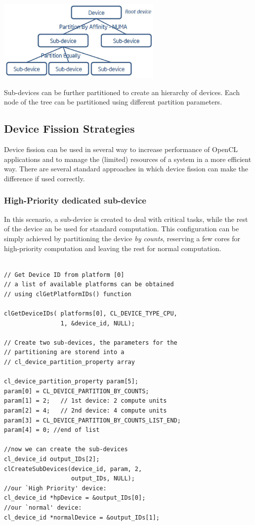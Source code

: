 \begin{figurehere}
 \centering
 \includegraphics[width=8cm, height=4cm]{./eps/partitionTree.eps}
 \caption{Sub-devices can be further partitioned to create an hierarchy of devices. Each node of the tree can be partitioned using different partition parameters.}
 \label{fig:subdevicestree}
\end{figurehere}

\subsection{Device Fission Strategies}
Device fission can be used in several way to increase performance of OpenCL applications and to manage the (limited) resources of a system in a more efficient way. There are several standard approaches in which device fission can make the difference if used correctly.

\subsubsection{High-Priority dedicated sub-device}
In this scenario, a sub-device is created to deal with critical tasks, while the rest of the device an be used for standard computation.
This configuration can be simply achieved by partitioning the device \textit{by counts}, reserving a few cores for high-priority computation and leaving the rest for normal computation.

{\footnotesize\begin{verbatim}

// Get Device ID from platform [0]
// a list of available platforms can be obtained
// using clGetPlatformIDs() function

clGetDeviceIDs( platforms[0], CL_DEVICE_TYPE_CPU,
                1, &device_id, NULL);
								
// Create two sub-devices, the parameters for the
// partitioning are storend into a 
// cl_device_partition_property array

cl_device_partition_property param[5];
param[0] = CL_DEVICE_PARTITION_BY_COUNTS;
param[1] = 2;   // 1st device: 2 compute units
param[2] = 4; 	// 2nd device: 4 compute units
param[3] = CL_DEVICE_PARTITION_BY_COUNTS_LIST_END;
param[4] = 0; //end of list

//now we can create the sub-devices
cl_device_id output_IDs[2]; 
clCreateSubDevices(device_id, param, 2,
                   output_IDs, NULL);
//our `High Priority' device:
cl_device_id *hpDevice = &output_IDs[0];  
//our `normal' device:    
cl_device_id *normalDevice = &output_IDs[1]; 

\end{verbatim}}

